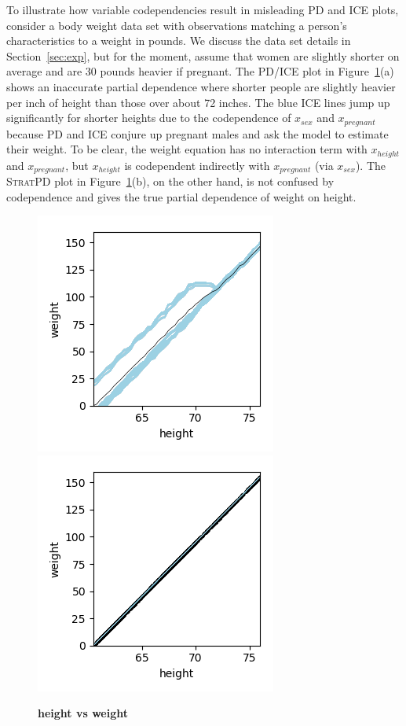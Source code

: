 \documentclass[12pt]{article}
\newcommand{\secref}[1]{Section~\ref{#1}}
\newcommand{\figref}[1]{Figure~\ref{#1}}
\newcommand{\spd}{\fontfamily{cmr}\textsc{\small StratPD}}
\begin{document}
To illustrate how variable codependencies result in misleading PD and ICE plots, consider a body weight data set with observations matching a person's characteristics to a weight in pounds. We discuss the data set details in \secref{sec:exp}, but for the moment, assume that women are slightly shorter on average and are 30 pounds heavier if pregnant. The PD/ICE plot in \figref{fig:height_vs_weight}(a) shows an inaccurate partial dependence where shorter people are slightly heavier per inch of height than those over about 72 inches. The blue ICE lines jump up significantly for shorter heights due to the codependence of $x_{sex}$ and $x_{pregnant}$ because PD and ICE conjure up pregnant males and ask the model to estimate their weight.  To be clear, the weight equation has no interaction term with $x_{height}$ and $x_{pregnant}$, but $x_{height}$ is codependent indirectly with $x_{pregnant}$ (via $x_{sex}$).  The \spd{} plot in \figref{fig:height_vs_weight}(b), on the other hand, is not confused by codependence and gives the true partial dependence of weight on height.

\begin{figure}[htbp]
\begin{center}
\includegraphics[scale=0.7]{images/height_vs_weight_pdp.png}
\includegraphics[scale=0.7]{images/height_vs_weight_stratpd.png}
\caption{{\bf  height vs weight}}
\label{fig:height_vs_weight}
\end{center}
\end{figure}
\end{document}
